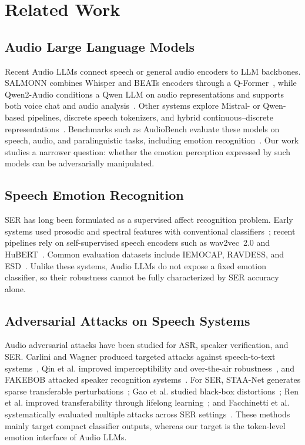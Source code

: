 \section{Related Work}
\label{sec:related_work}

\subsection{Audio Large Language Models}

Recent Audio LLMs connect speech or general audio encoders to LLM backbones.
SALMONN combines Whisper and BEATs encoders through a Q-Former~\cite{salmonn}, while Qwen2-Audio conditions a Qwen LLM on audio representations and supports both voice chat and audio analysis~\cite{qwen2audio}.
Other systems explore Mistral- or Qwen-based pipelines, discrete speech tokenizers, and hybrid continuous--discrete representations~\cite{voxtral,opens2s,glm4voice,kimiaudio}.
Benchmarks such as AudioBench evaluate these models on speech, audio, and paralinguistic tasks, including emotion recognition~\cite{audiobench}.
Our work studies a narrower question: whether the emotion perception expressed by such models can be adversarially manipulated.

\subsection{Speech Emotion Recognition}

SER has long been formulated as a supervised affect recognition problem.
Early systems used prosodic and spectral features with conventional classifiers~\cite{schuller2009interspeech}; recent pipelines rely on self-supervised speech encoders such as wav2vec~2.0 and HuBERT~\cite{wav2vec2,hubert}.
Common evaluation datasets include IEMOCAP, RAVDESS, and ESD~\cite{iemocap,ravdess,esd}.
Unlike these systems, Audio LLMs do not expose a fixed emotion classifier, so their robustness cannot be fully characterized by SER accuracy alone.

\subsection{Adversarial Attacks on Speech Systems}

Audio adversarial attacks have been studied for ASR, speaker verification, and SER.
Carlini and Wagner produced targeted attacks against speech-to-text systems~\cite{carlini2018audio}, Qin et al. improved imperceptibility and over-the-air robustness~\cite{qin2019imperceptible}, and FAKEBOB attacked speaker recognition systems~\cite{fakebob}.
For SER, STAA-Net generates sparse transferable perturbations~\cite{staanet}; Gao et al. studied black-box distortions~\cite{gao2022}; Ren et al. improved transferability through lifelong learning~\cite{ren2020}; and Facchinetti et al. systematically evaluated multiple attacks across SER settings~\cite{facchinetti2024}.
These methods mainly target compact classifier outputs, whereas our target is the token-level emotion interface of Audio LLMs.


